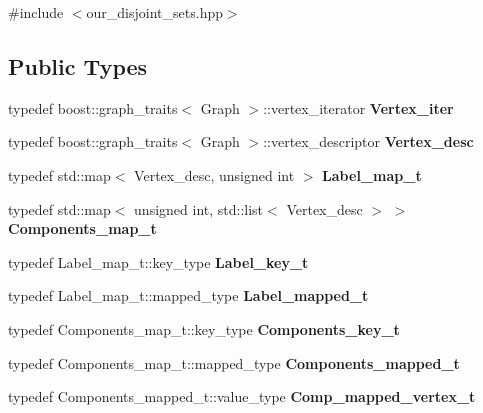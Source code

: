 {\ttfamily \#include $<$our\_\-disjoint\_\-sets.hpp$>$}\subsection*{Public Types}
\begin{DoxyCompactItemize}
\item 
\hypertarget{classour__disjoint__sets_af331ecb5ad051216273fe2de9c4f3583}{
typedef boost::graph\_\-traits$<$ Graph $>$::vertex\_\-iterator {\bfseries Vertex\_\-iter}}
\label{classour__disjoint__sets_af331ecb5ad051216273fe2de9c4f3583}

\item 
\hypertarget{classour__disjoint__sets_a35cce28d3bc811993b9e880281745f0e}{
typedef boost::graph\_\-traits$<$ Graph $>$::vertex\_\-descriptor {\bfseries Vertex\_\-desc}}
\label{classour__disjoint__sets_a35cce28d3bc811993b9e880281745f0e}

\item 
\hypertarget{classour__disjoint__sets_a5e7555bfef19190e3c65f722024f2214}{
typedef std::map$<$ Vertex\_\-desc, unsigned int $>$ {\bfseries Label\_\-map\_\-t}}
\label{classour__disjoint__sets_a5e7555bfef19190e3c65f722024f2214}

\item 
\hypertarget{classour__disjoint__sets_a607a97b4454defc96ef7f684cbea3d83}{
typedef std::map$<$ unsigned int, std::list$<$ Vertex\_\-desc $>$ $>$ {\bfseries Components\_\-map\_\-t}}
\label{classour__disjoint__sets_a607a97b4454defc96ef7f684cbea3d83}

\item 
\hypertarget{classour__disjoint__sets_a79c7ea38049a78d9e74fbaa29edaa0a1}{
typedef Label\_\-map\_\-t::key\_\-type {\bfseries Label\_\-key\_\-t}}
\label{classour__disjoint__sets_a79c7ea38049a78d9e74fbaa29edaa0a1}

\item 
\hypertarget{classour__disjoint__sets_a686da13c5c36a0741ad28427e161578f}{
typedef Label\_\-map\_\-t::mapped\_\-type {\bfseries Label\_\-mapped\_\-t}}
\label{classour__disjoint__sets_a686da13c5c36a0741ad28427e161578f}

\item 
\hypertarget{classour__disjoint__sets_a752c86546f6ecbafbdeae7bf0a907c0e}{
typedef Components\_\-map\_\-t::key\_\-type {\bfseries Components\_\-key\_\-t}}
\label{classour__disjoint__sets_a752c86546f6ecbafbdeae7bf0a907c0e}

\item 
\hypertarget{classour__disjoint__sets_aa07b787857c3bcd01bbe9bf6f0bb5e94}{
typedef Components\_\-map\_\-t::mapped\_\-type {\bfseries Components\_\-mapped\_\-t}}
\label{classour__disjoint__sets_aa07b787857c3bcd01bbe9bf6f0bb5e94}

\item 
\hypertarget{classour__disjoint__sets_a510c748b30dafffd0ce483e9cdfae49b}{
typedef Components\_\-mapped\_\-t::value\_\-type {\bfseries Comp\_\-mapped\_\-vertex\_\-t}}
\label{classour__disjoint__sets_a510c748b30dafffd0ce483e9cdfae49b}

\end{DoxyCompactItemize}
